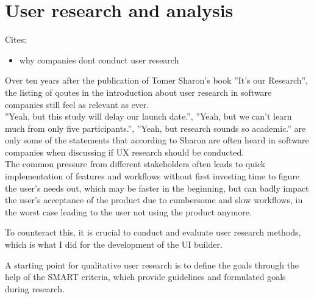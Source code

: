 %
\chapter{User research and analysis}
\label{chap:research}



Cites:
\begin{itemize}
  \item \cite{Ross:2016} why companies dont conduct user research
\end{itemize}

Over ten years after the publication of Tomer Sharon's book ''It's our Research'', the listing of qoutes in the introduction about user research in software companies still feel as relevant as ever.
\\
''Yeah, but this study will delay our launch date.'', ''Yeah, but we can't learn much from only five participants.'', ''Yeah, but research sounds so academic.'' \cite[p. 4]{Sharon:2012mk} are only some of the statements that according to Sharon are often heard in software companies when discussing if UX research should be conducted.
\\
The common pressure from different stakeholders often leads to quick implementation of features and workflows without first investing time to figure the user's needs out, which may be faster in the beginning, but can badly impact the user's acceptance of the product due to cumbersome and slow workflows,
in the worst case leading to the user not using the product anymore.

To counteract this, it is crucial to conduct and evaluate user research methods, which is what I did for the development of the UI builder.

A starting point for qualitative user research is to define the goals through the help of the SMART criteria, which provide guidelines and formulated goals during research.

